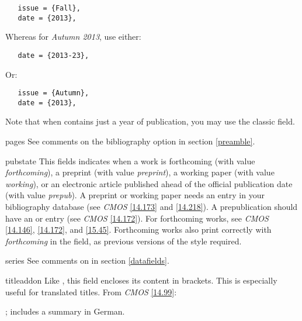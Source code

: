 \documentclass[11pt,letterpaper,oneside]{article}
\begin{document}
\begin{marglist}
\begin{verbatim}
   issue = {Fall},
   date = {2013},
\end{verbatim}

\noindent Whereas for \textit{Autumn 2013}, use either:

\begin{verbatim}
   date = {2013-23},
\end{verbatim}

\noindent Or:

\begin{verbatim}
   issue = {Autumn},
   date = {2013},
\end{verbatim}

\noindent Note that when  contains just a year of
publication, you may use the classic  field.

\item[pages] See comments on the  bibliography option in
section \ref{preamble}.

\item[pubstate] This fields indicates when a work is forthcoming (with
value \textit{forthcoming}), a preprint (with value
\textit{preprint}), a working paper (with value \textit{working}), or
an electronic article published ahead of the official publication date
(with value \textit{prepub}). A preprint or working paper needs an
 entry in your bibliography database (see
\textit{CMOS} \ref{14.173} and \ref{14.218}). A prepublication should
have an  or  entry (see
\textit{CMOS} \ref{14.172}). For forthcoming works, see \textit{CMOS}
\ref{14.146}, \ref{14.172}, and \ref{15.45}. Forthcoming works also
print correctly with \textit{forthcoming} in the 
field, as previous versions of the style required.

\begin{bibonly}
\nocite{faraday,huang2015,jubb2015,lucki1980}
\end{bibonly}

\item[series] See comments on  in section
\ref{datafields}.

\item[titleaddon] Like , this field encloses its
content in brackets. This is especially useful for translated titles.
From \textit{CMOS} \ref{14.99}:

\begin{citebib}
\item \cite{wereszycki1977}; includes a summary in German.
\item \cite{pirumova1977b}
\end{citebib}


\end{marglist}
\end{document}
